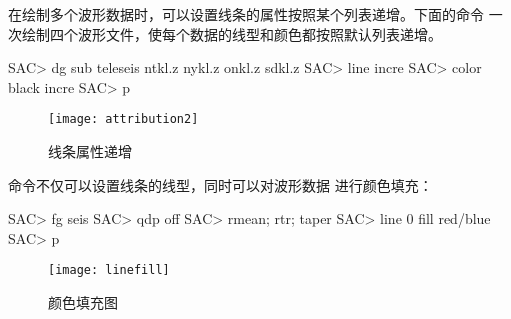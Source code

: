 在绘制多个波形数据时，可以设置线条的属性按照某个列表递增。下面的命令
一次绘制四个波形文件，使每个数据的线型和颜色都按照默认列表递增。
\begin{SACCode}
SAC> dg sub teleseis ntkl.z nykl.z onkl.z sdkl.z
SAC> line incre
SAC> color black incre
SAC> p
\end{SACCode}

\begin{figure}[H]
\centering
\texttt{[image: attribution2]}
\caption{线条属性递增}
\end{figure}

 命令不仅可以设置线条的线型，同时可以对波形数据
进行颜色填充：
\begin{SACCode}
SAC> fg seis
SAC> qdp off
SAC> rmean; rtr; taper
SAC> line 0 fill red/blue
SAC> p
\end{SACCode}

\begin{figure}[H]
\centering
\texttt{[image: linefill]}
\caption{颜色填充图}
\end{figure}
